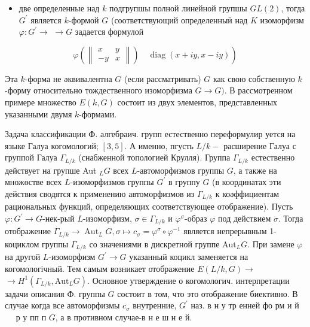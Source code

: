\documentclass[10pt]{article}
\begin{document}
\begin{itemize}

  \item две определенные над $k$ подгрупшы полной линейной групшы $G L(2)$, тогда $G^{\prime}$ является $k$-формой $G$ (соответствующий определенныӥ над $K$ изоморфизм $\varphi: G^{\prime} \rightarrow$ $\rightarrow G$ задается формулой

\end{itemize}



\[

\left.\varphi\left(\left\|\begin{array}{rr}

x & y \\

-y & x

\end{array}\right\|\right) \quad \operatorname{diag}(x+i y, x-i y)\right)

\]



Эта $k$-форма не әквивалентна $G$ (если рассматривать) $G$ как свою собственную $k$-форму относительно тождественного изоморфизма $G \rightarrow G)$. В рассмотренном примере множество $E(k, G)$ состоит из двух элементов, представленных указанными двумя $k$-формами.



Задача классификации Ф. алгебраич. групп естественно переформулир уется на языке Галуа когомологий; $[3,5]$. А именно, пгусть $L / k-$ расширение Галуа с группой Галуа $\Gamma_{L / k}$ (снабженной топологией Крулля). Группа $\Gamma_{L / k}$ естественно действует на групше Aut ${ }_{L} G$ всех $L$-автоморфизмов группы $G$, а также на множөстве всех $L$-изоморфизмов группы $G^{\prime}$ в группу $G$ (в координатах эти действия сводятся к применению автоморфизмов из $\Gamma_{L / k}$ к коәффициентам рациональных функций, определяющих соответствующее отображение). Пусть $\varphi: G^{\prime} \rightarrow G$-нек-рый $L$-изоморфизм, $\sigma \in \Gamma_{L / k}$ и $\varphi^{\sigma}$-образ $\varphi$ под действием $\sigma$. Тогда отображение $\Gamma_{L / k} \rightarrow \operatorname{Aut}_{L} G, \sigma \longmapsto c_{\sigma}=\varphi^{\sigma} \circ \varphi^{-1}$ является непрерывным 1-коциклом группы $\Gamma_{L / k}$ со значениями в дискретной группе $\mathrm{Aut}_{L} G$. При замене $\varphi$ на другой $L$-изоморфизм $G^{\prime} \rightarrow G$ указанный коцикл заменяется на когомологічный. Тем самым возникает отображение $E(L / k, G) \rightarrow$ $\rightarrow H^{1}\left(\Gamma_{L / k}, \mathrm{Aut}_{L} G\right)$. Основное утверждение о когомологич. интерпретации задачи описания Ф. группы $G$ состоит в том, что это отображение биективно. В случае когда все автоморфизмы $c_{\sigma}$ внутренние, $G^{\prime}$ наз. в н у тр енней фо рм и й $\quad$ р у пп п $G$, а в противном случае-в н е ш н е й.
\end{document}
